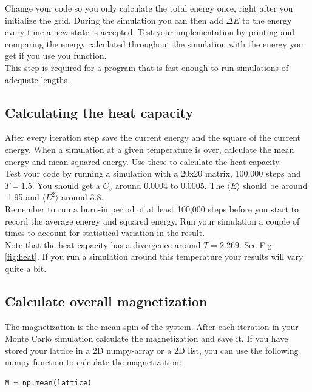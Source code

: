 \documentclass{article}
\begin{document}
Change your code so you only calculate the total energy once, right after you initialize the grid.
During the simulation you can then add $\Delta E$ to the energy every time a new state is accepted.
Test your implementation by printing and comparing the energy calculated throughout the simulation with the energy you get if you use you  function.\\

This step is required for a program that is fast enough to run simulations of adequate lengths.

\subsection{Calculating the heat capacity}

After every iteration step save the current energy and the square of the current energy.
When a simulation at a given temperature is over, calculate the mean energy and mean squared energy.
Use these to calculate the heat capacity.\\

Test your code by running a simulation with a 20x20 matrix, 100,000 steps and $T = 1.5$.
You should get a $C_v$ around 
0.0004 to 0.0005.
The $\langle E \rangle$ should be around -1.95 and $\langle E^2 \rangle$ around 3.8.\\

Remember to run a burn-in period of at least 100,000 steps before you start to record the average energy and squared energy.
Run your simulation a couple of times to account for statistical variation in the result.\\

Note that the heat capacity has a divergence around $T = 2.269$. See Fig. \ref{fig:heat}.
If you run a simulation around this temperature your results will vary quite a bit.

\subsection{Calculate overall magnetization}

The magnetization is the mean spin of the system.
After each iteration in your Monte Carlo simulation calculate the magnetization and save it.
If you have stored your lattice in a 2D numpy-array or a 2D list, you can use the following numpy function to calculate the magnetization:

\begin{lstlisting}[language=python]
M = np.mean(lattice)
\end{lstlisting}
\end{document}
